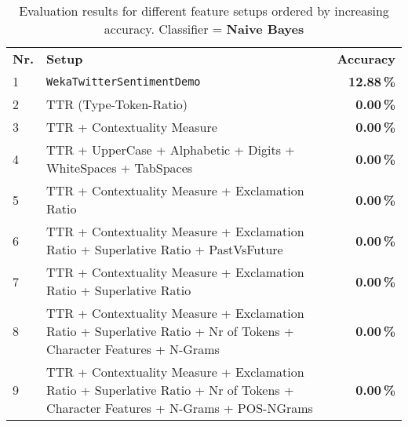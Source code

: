 \documentclass[journal, a4paper]{IEEEtran}
\begin{document}
\begin{table}[!hbt]
	\begin{center}
		\caption{Evaluation results for different feature setups ordered by increasing accuracy. Classifier = \textbf{Naive Bayes}}
		\label{tab:results-nb}
		\begin{tabularx}{80mm}{| l | X | r |}
			\hline
			\rowcolor{lightgray}
			\multicolumn{3}{| c |}{\textbf{Naive Bayes}} 									\\ \hline
			\rowcolor{lightgray}
			\textbf{Nr.}		&	\textbf{Setup}					& \textbf{Accuracy}		\\ \hline\hline
			1			&	\texttt{WekaTwitterSentimentDemo}	& \textbf{12.88\,\%}		\\ \hline
			2			&	TTR 	(Type-Token-Ratio)			& \textbf{0.00\,\%}		\\ \hline
			3			&	TTR + Contextuality Measure			& \textbf{0.00\,\%}		\\ \hline
			4			&	TTR + UpperCase + Alphabetic + Digits + WhiteSpaces + TabSpaces
																& \textbf{0.00\,\%}		\\ \hline
			5			& 	TTR + Contextuality Measure + Exclamation Ratio
																& \textbf{0.00\,\%}		\\ \hline
			6			&	TTR + Contextuality Measure + Exclamation Ratio + Superlative Ratio + PastVsFuture 
																& \textbf{0.00\,\%}		\\ \hline
			7			&	TTR + Contextuality Measure + Exclamation Ratio + Superlative Ratio 
																& \textbf{0.00\,\%}		\\ \hline
			8			&	TTR + Contextuality Measure + Exclamation Ratio + Superlative Ratio +
							Nr of Tokens + Character Features + N-Grams
																& \textbf{0.00\,\%}		\\ \hline
			9			&	TTR + Contextuality Measure + Exclamation Ratio + Superlative Ratio +
							Nr of Tokens + Character Features + N-Grams + POS-NGrams
																& \textbf{0.00\,\%}		\\ \hline
			\hline
		\end{tabularx}
	\end{center}
\end{table}
\end{document}
